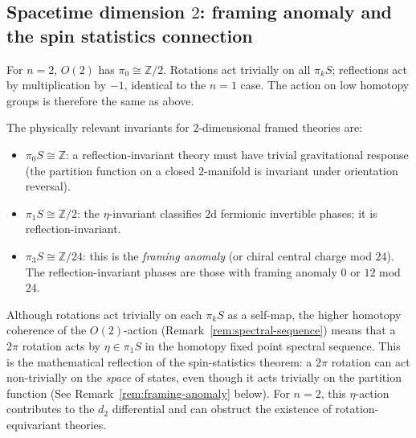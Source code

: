 \documentclass{amsart}
\begin{document}
\subsection{Spacetime dimension \texorpdfstring{$2$}{2}: framing anomaly and the spin statistics connection}

For $n=2$, $O(2)$ has $\pi_0 \cong \mathbb{Z}/2$. Rotations act trivially on all $\pi_k S$; reflections act by multiplication by $-1$, identical to the $n=1$ case. The action on low homotopy groups is therefore the same as above.

The physically relevant invariants for $2$-dimensional framed theories are:
\begin{itemize}
    \item[$\natural_1$] $\pi_0 S \cong \mathbb{Z}$: a reflection-invariant theory must have trivial gravitational response (the partition function on a closed $2$-manifold is invariant under orientation reversal).
    \item[$\natural_2$] $\pi_1 S \cong \mathbb{Z}/2$: the $\eta$-invariant classifies $2$d fermionic invertible phases; it is reflection-invariant.
    \item[$\natural_3$] $\pi_3 S \cong \mathbb{Z}/24$: this is the \emph{framing anomaly} (or chiral central charge mod $24$). The reflection-invariant phases are those with framing anomaly $0$ or $12$ mod $24$. 
\end{itemize}

\begin{remark}
    Although rotations act trivially on each $\pi_k S$ as a self-map, the higher homotopy coherence of the $O(2)$-action (Remark~\ref{rem:spectral-sequence}) means that a $2\pi$ rotation acts by $\eta \in \pi_1 S$ in the homotopy fixed point spectral sequence. This is the mathematical reflection of the spin-statistics theorem: a $2 \pi$ rotation can act non-trivially on the \emph{space} of states, even though it acts trivially on the partition function (See Remark~\ref{rem:framing-anomaly} below). For $n=2$, this $\eta$-action contributes to the $d_2$ differential and can obstruct the existence of rotation-equivariant theories.
\end{remark}
\end{document}
